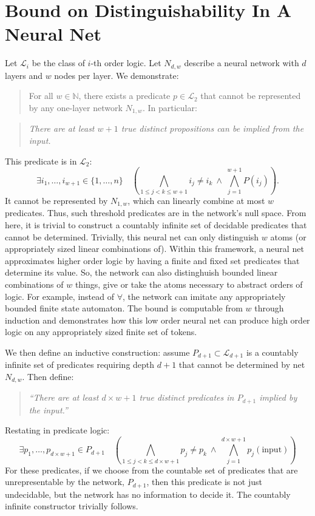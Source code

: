 \documentclass[12pt]{article}
\theoremstyle{plain}
\begin{document}
\section{Bound on Distinguishability In A Neural Net}
Let $\mathcal{L}_i$ be the class of $i$-th order logic. Let $N_{d,w}$ 
describe a neural network with $d$ layers and $w$ nodes per layer. We 
demonstrate:

\begin{quote}
For all $w \in \mathbb{N}$, there exists a predicate $p \in \mathcal{L}_2$ 
that cannot be represented by any one-layer network $N_{1,w}$. In particular:
\end{quote}
\begin{quote}
\emph{There are at least $w+1$ true distinct propositions can be implied from the input.}
\end{quote}

This predicate is in $\mathcal{L}_2$: 
$$
    \exists i_1, \dots, i_{w+1} \in \{1, \dots, n\} \quad
    \left(
    \bigwedge_{1 \leq j < k \leq w+1} i_j \neq i_k \ \wedge\
    \bigwedge_{j=1}^{w+1} P(i_j)
    \right).
$$
It cannot be represented by $N_{1,w}$, which can linearly combine at most 
$w$ predicates. Thus, such threshold predicates are in the network's null 
space.  From here, it is trivial to construct a countably infinite set
of decidable predicates that cannot be determined.  Trivially, this neural
net can only distinguish $w$ atoms (or appropriately sized linear combinations
of).  Within this framework, a neural net approximates higher order logic
by having a finite and fixed set predicates that determine its value.
So, the network can also distinghuish bounded linear combinations of $w$
things, give or take the atoms necessary to abstract orders of logic.
For example, instead of $\forall$, the network can imitate any appropriately
bounded finite state automaton.  The bound is computable from $w$ through
induction and demonstrates how this low order neural net can produce
high order logic on any appropriately sized finite set of tokens.

We then define an inductive construction: assume $P_{d+1} \subset 
\mathcal{L}_{d+1}$ is a countably infinite set of predicates requiring depth 
$d+1$ that cannot be determined by net $N_{d,w}$. Then define:
\begin{quote}
\emph{``There are at least $d \times w + 1$ true distinct predicates in $P_{d+1}$ implied by the input.''}
\end{quote}
Restating in predicate logic:
$$
    \exists p_1, \dots, p_{d \times w + 1} \in P_{d+1} \quad
    \left(
    \bigwedge_{1 \leq j < k \leq d \times w + 1} p_j \neq p_k \ \wedge\
    \bigwedge_{j=1}^{d \times w + 1} p_j(\text{input})
    \right)
$$
For these predicates, if we choose from the countable set of predicates that
are unrepresentable by the network, $P_{d+1}$, then this predicate is not
just undecidable, but the network has no information to decide it. The
countably infinite constructor trivially follows.
\end{document}
